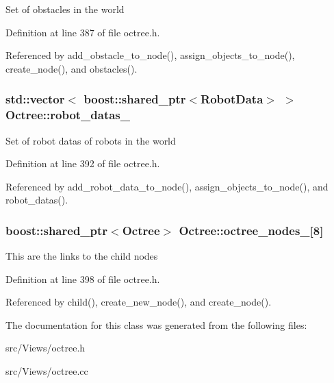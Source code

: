 Set of obstacles in the world 

Definition at line 387 of file octree.h.

Referenced by add\_\-obstacle\_\-to\_\-node(), assign\_\-objects\_\-to\_\-node(), create\_\-node(), and obstacles().\hypertarget{class_octree_f93af4c2615db522f4496fd050a5b61b}{
\subsubsection[robot\_\-datas\_\-]{\setlength{\rightskip}{0pt plus 5cm}std::vector$<$ boost::shared\_\-ptr$<${\bf RobotData}$>$ $>$ {\bf Octree::robot\_\-datas\_\-}}}
\label{class_octree_f93af4c2615db522f4496fd050a5b61b}


Set of robot datas of robots in the world 

Definition at line 392 of file octree.h.

Referenced by add\_\-robot\_\-data\_\-to\_\-node(), assign\_\-objects\_\-to\_\-node(), and robot\_\-datas().\hypertarget{class_octree_a7b4d7aa295f945512b9e39d8fd2d5d6}{
\subsubsection[octree\_\-nodes\_\-]{\setlength{\rightskip}{0pt plus 5cm}boost::shared\_\-ptr$<${\bf Octree}$>$ {\bf Octree::octree\_\-nodes\_\-}\mbox{[}8\mbox{]}}}
\label{class_octree_a7b4d7aa295f945512b9e39d8fd2d5d6}


This are the links to the child nodes 

Definition at line 398 of file octree.h.

Referenced by child(), create\_\-new\_\-node(), and create\_\-node().

The documentation for this class was generated from the following files:\begin{CompactItemize}
\item 
src/Views/octree.h\item 
src/Views/octree.cc\end{CompactItemize}
